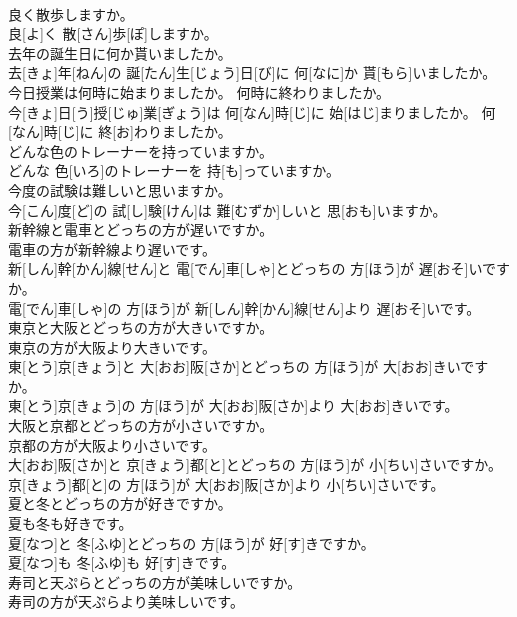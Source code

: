\documentclass[8pt]{extreport}
\begin{document}
\begin{CJK}{UTF8}{min}
\\	良く散歩しますか。	
\\	良[よ]く 散[さん]歩[ぽ]しますか。
\\	去年の誕生日に何か貰いましたか。	
\\	去[きょ]年[ねん]の 誕[たん]生[じょう]日[び]に 何[なに]か 貰[もら]いましたか。
\\	今日授業は何時に始まりましたか。 何時に終わりましたか。	
\\	今[きょ]日[う]授[じゅ]業[ぎょう]は 何[なん]時[じ]に 始[はじ]まりましたか。 何[なん]時[じ]に 終[お]わりましたか。
\\	どんな色のトレーナーを持っていますか。	
\\	どんな 色[いろ]のトレーナーを 持[も]っていますか。
\\	今度の試験は難しいと思いますか。	
\\	今[こん]度[ど]の 試[し]験[けん]は 難[むずか]しいと 思[おも]いますか。
\\	新幹線と電車とどっちの方が遅いですか。 
\\	電車の方が新幹線より遅いです。	
\\	新[しん]幹[かん]線[せん]と 電[でん]車[しゃ]とどっちの 方[ほう]が 遅[おそ]いですか。 
\\	電[でん]車[しゃ]の 方[ほう]が 新[しん]幹[かん]線[せん]より 遅[おそ]いです。
\\	東京と大阪とどっちの方が大きいですか。 
\\	東京の方が大阪より大きいです。	
\\	東[とう]京[きょう]と 大[おお]阪[さか]とどっちの 方[ほう]が 大[おお]きいですか。 
\\	東[とう]京[きょう]の 方[ほう]が 大[おお]阪[さか]より 大[おお]きいです。
\\	大阪と京都とどっちの方が小さいですか。 
\\	京都の方が大阪より小さいです。	
\\	大[おお]阪[さか]と 京[きょう]都[と]とどっちの 方[ほう]が 小[ちい]さいですか。 
\\	京[きょう]都[と]の 方[ほう]が 大[おお]阪[さか]より 小[ちい]さいです。
\\	夏と冬とどっちの方が好きですか。 
\\	夏も冬も好きです。	
\\	夏[なつ]と 冬[ふゆ]とどっちの 方[ほう]が 好[す]きですか。 
\\	夏[なつ]も 冬[ふゆ]も 好[す]きです。
\\	寿司と天ぷらとどっちの方が美味しいですか。 
\\	寿司の方が天ぷらより美味しいです。	

\end{CJK}
\end{document}

